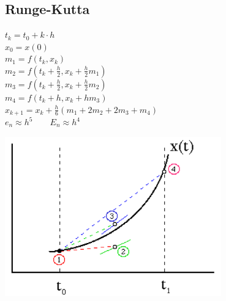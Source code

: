 \begin{minipage}{0.6\linewidth}
    \subsection{Runge-Kutta}
    $t_k = t_0 + k \cdot h$ \\
    $x_0 = x(0)$ \\
    $m_1 = f(t_k, x_k)$\\
    $m_2 = f(t_k + \frac{h}{2}, x_k + \frac{h}{2} m_1)$ \\
    $m_3 = f(t_k + \frac{h}{2}, x_k + \frac{h}{2} m_2)$ \\
    $m_4 = f(t_k + h, x_k + hm_3)$ \\
    $x_{k+1} = x_k + \frac{h}{6} \left(m_1 + 2m_2 + 2m_3 + m_4\right)$ \\
    $e_n \approx h^5 \qquad E_n \approx h^4$
\end{minipage}
\begin{minipage}{0.4\linewidth}
	\includegraphics[width= 0.7\textwidth]{images/RK4.png}
\end{minipage}